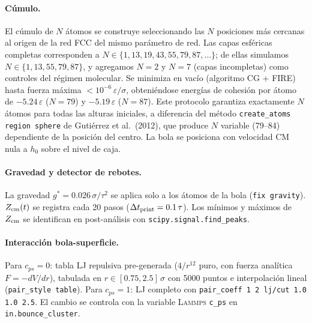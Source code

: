 \documentclass[12pt,a4paper]{article}
\newcommand{\eps}{\varepsilon}
\newcommand{\gstar}{g^*}
\newcommand{\lammps}{\textsc{Lammps}}
\begin{document}
\paragraph{Cúmulo.}
El cúmulo de $N$ átomos se construye seleccionando las $N$ posiciones más
cercanas al origen de la red FCC del mismo parámetro de red. Las capas
esféricas completas corresponden a $N\in\{1,13,19,43,55,79,87,\ldots\}$;
de ellas simulamos $N\in\{1,13,55,79,87\}$, y agregamos $N=2$ y $N=7$
(capas incompletas) como controles del régimen molecular.
Se minimiza en vacío (algoritmo CG + FIRE) hasta fuerza máxima
$<10^{-6}\,\eps/\sigma$, obteniéndose energías de cohesión por átomo de
$-5.24\,\eps$ ($N=79$) y $-5.19\,\eps$ ($N=87$). Este protocolo garantiza
exactamente $N$ átomos para todas las alturas iniciales, a diferencia del
método \texttt{create\_atoms region sphere} de Gutiérrez et al.\ (2012),
que produce $N$ variable (79--84) dependiente de la posición del centro.
La bola se posiciona con velocidad CM nula a $h_0$ sobre el nivel de caja.

\paragraph{Gravedad y detector de rebotes.}
La gravedad $\gstar=0.026\,\sigma/\tau^2$ se aplica solo a los átomos de la
bola (\texttt{fix gravity}). $Z_{\rm cm}(t)$ se registra cada 20 pasos
($\Delta t_{\rm print}=0.1\,\tau$). Los mínimos y máximos de $Z_{\rm cm}$
se identifican en post-análisis con \texttt{scipy.signal.find\_peaks}.

\paragraph{Interacción bola-superficie.}
Para $c_{ps}=0$: tabla LJ repulsiva pre-generada ($4/r^{12}$ puro, con
fuerza analítica $F=-dV/dr$), tabulada en $r\in[0.75,2.5]\,\sigma$ con
5000 puntos e interpolación lineal (\texttt{pair\_style table}).
Para $c_{ps}=1$: LJ completo con \texttt{pair\_coeff 1 2 lj/cut 1.0 1.0 2.5}.
El cambio se controla con la variable \lammps{} \texttt{c\_ps} en
\texttt{in.bounce\_cluster}.
\end{document}
